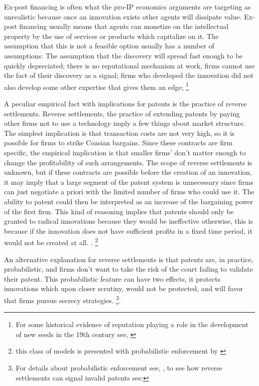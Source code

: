 \documentclass[12pt]{article}
\numberwithin{equation}{section}
\begin{document}
Ex-post financing is often what the pro-IP economics arguments are targeting as unrealistic because once an innovation exists other agents will dissipate value. Ex-post financing usually means that agents can monetize on the intellectual property by the use of services or products which capitalize on it. The assumption that this is not a feasible option usually has a number of assumptions: The assumption that the discovery will spread fast enough to be quickly depreciated; there is no reputational mechanism at work, firms cannot use the fact of their discovery as a signal; firms who developed the innovation did not also develop some other expertise that gives them an edge; \footnote{For some historical evidence of reputation playing a role in the development of new seeds in the 19th century see, \cite{charnley2013seeds}}

A peculiar empirical fact with implications for patents is the practice of reverse settlements. Reverse settlements, the practice of extending patents by paying other firms not to use a technology imply a few things about market structure. The simplest implication is that transaction costs are not very high, so it is possible for firms to strike Coasian bargains. Since these contracts are firm specific, the empirical implication is that smaller firms' don't matter enough to change the profitability of such arrangements. The scope of reverse settlements is unknown, but if these contracts are possible before the creation of an innovation, it may imply that a large segment of the patent system is unnecessary since firms can just negotiate a priori with the limited number of firms who could use it. The ability to patent could then be interpreted as an increase of the bargaining power of the first firm\cite{green1995division}. This kind of reasoning implies that patents should only be granted to radical innovations because they would be ineffective otherwise, this is because if the innovation does not have sufficient profits in a fixed time period, it would not be created at all. \cite{o1998patentability}. \footnote{this class of models is presented with probabilistic enforcement by \cite{chou2007division} }

An alternative explanation for reverse settlements is that patents are, in practice, probabilistic, and firms don't want to take the risk of the court failing to validate their patent. This probabilistic feature can have two effects, it protects innovations which upon closer scrutiny, would not be protected, and will favor that firms pursue secrecy strategies. \footnote{For details about probabilistic enforcement see, \cite{Lemley2005}, to see how reverse settlements can signal invalid patents see:\cite{Dolin2011}}.
\end{document}
